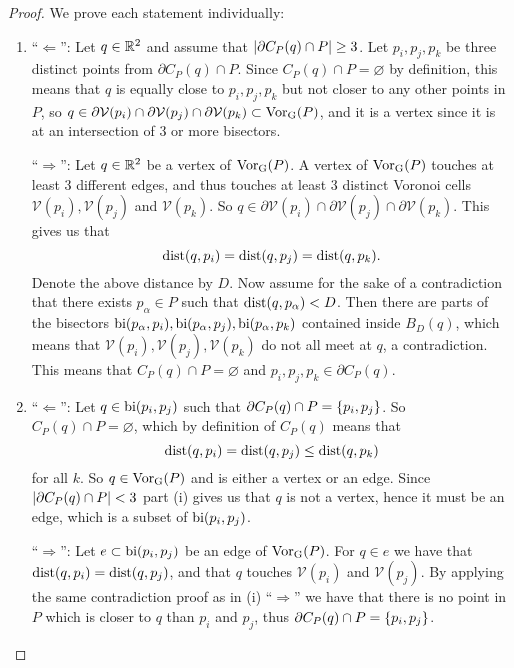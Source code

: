 \begin{proof}
We prove each statement individually:
\begin{enumerate}[{(}i{):}]
    \item ``$\Leftarrow$'': Let $q \in \mathbb{R}^2$ and assume that $\left\lvert \partial C_P(q) \cap P \right\rvert \geq 3$. Let $p_i, p_j, p_k$ be three distinct points from $\partial C_P(q) \cap P$. Since $C_P(q) \cap P = \varnothing$ by definition, this means that $q$ is equally close to $p_i, p_j, p_k$ but not closer to any other points in $P$, so $q \in \partial\mathcal{V}(p_i) \cap \partial\mathcal{V}(p_j) \cap \partial\mathcal{V}(p_k) \subset \operatorname{Vor_{G}}(P)$, and it is a vertex since it is at an intersection of 3 or more bisectors.

    ``$\Rightarrow$'': Let $q \in \mathbb{R}^2$ be a vertex of $\operatorname{Vor_{G}}(P)$. A vertex of $\operatorname{Vor_{G}}(P)$ touches at least 3 different edges, and thus touches at least 3 distinct Voronoi cells $\mathcal{V}(p_i), \mathcal{V}(p_j)$ and $\mathcal{V}(p_k)$. So $q \in \partial\mathcal{V}(p_i) \cap \partial\mathcal{V}(p_j) \cap \partial\mathcal{V}(p_k)$. This gives us that
    \[
        \operatorname{dist}(q, p_i) = \operatorname{dist}(q, p_j) = \operatorname{dist}(q, p_k).
    \]
    Denote the above distance by $D$. Now assume for the sake of a contradiction that there exists $p_\alpha \in P$ such that $\operatorname{dist}(q, p_{\alpha}) < D$. Then there are parts of the bisectors $\operatorname{bi}(p_{\alpha}, p_i), \operatorname{bi}(p_{\alpha}, p_j), \operatorname{bi}(p_{\alpha}, p_k)$ contained inside $B_D(q)$, which means that $\mathcal{V}(p_i), \mathcal{V}(p_j), \mathcal{V}(p_k)$ do not all meet at $q$, a contradiction. This means that $C_P(q) \cap P = \varnothing$ and $p_i, p_j, p_k \in \partial C_P(q)$.

    \item ``$\Leftarrow$'': Let $q \in \operatorname{bi}(p_i, p_j)$ such that $\partial C_P(q) \cap P = \{p_i, p_j\}$. So $C_P(q) \cap P = \varnothing$, which by definition of $C_P(q)$ means that
    \[
        \operatorname{dist}(q, p_i) = \operatorname{dist}(q, p_j) \leq \operatorname{dist}(q, p_k)
    \]
    for all $k$. So $q \in \operatorname{Vor_{G}}(P)$ and is either a vertex or an edge. Since $\left\lvert \partial C_P(q) \cap P \right\rvert < 3$ part (i) gives us that $q$ is not a vertex, hence it must be an edge, which is a subset of $\operatorname{bi}(p_i, p_j)$. 

    ``$\Rightarrow$'': Let $e \subset \operatorname{bi}(p_i, p_j)$ be an edge of $\operatorname{Vor_{G}}(P)$. For $q \in e$ we have that $\operatorname{dist}(q, p_i) = \operatorname{dist}(q, p_j)$, and that $q$ touches $\mathcal{V}(p_i)$ and $\mathcal{V}(p_j)$. By applying the same contradiction proof as in (i) ``$\Rightarrow$'' we have that there is no point in $P$ which is closer to $q$ than $p_i$ and $p_j$, thus $\partial C_P(q) \cap P = \{p_i, p_j\}$.
\end{enumerate}
\end{proof}
